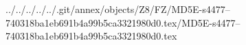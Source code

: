 ../../../../../.git/annex/objects/Z8/FZ/MD5E-s4477--740318ba1eb691b4a99b5ca3321980d0.tex/MD5E-s4477--740318ba1eb691b4a99b5ca3321980d0.tex